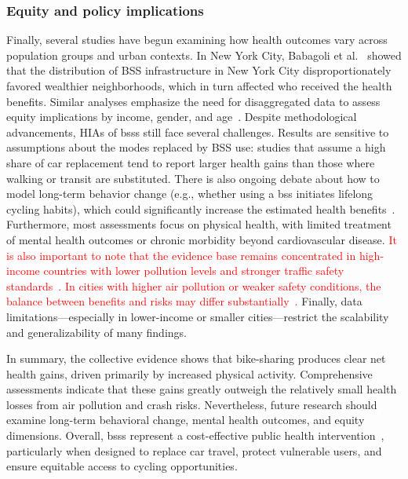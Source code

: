     \subsubsection{Equity and policy implications}

Finally, several studies have begun examining how health outcomes vary across population groups and urban contexts. In New York City, Babagoli et al.~\cite{Babagoli2019} showed that the distribution of BSS infrastructure in New York City disproportionately favored wealthier neighborhoods, which in turn affected who received the health benefits. Similar analyses emphasize the need for disaggregated data to assess equity implications by income, gender, and age~\cite{Clockston2021}. Despite methodological advancements, HIAs of \acp{bss} still face several challenges. Results are sensitive to assumptions about the modes replaced by BSS use: studies that assume a high share of car replacement tend to report larger health gains than those where walking or transit are substituted. There is also ongoing debate about how to model long-term behavior change (e.g., whether using a \ac{bss} initiates lifelong cycling habits), which could significantly increase the estimated health benefits~\cite{Bauman2017}. Furthermore, most assessments focus on physical health, with limited treatment of mental health outcomes or chronic morbidity beyond cardiovascular disease. \textcolor{red}{It is also important to note that the evidence base remains concentrated in high-income countries with lower pollution levels and stronger traffic safety standards~\cite{Teixeira2020, WHO2018}. In cities with higher air pollution or weaker safety conditions, the balance between benefits and risks may differ substantially~\cite{Tainio2016}.} Finally, data limitations—especially in lower-income or smaller cities—restrict the scalability and generalizability of many findings.


In summary, the collective evidence shows that bike-sharing produces clear net health gains, driven primarily by increased physical activity. Comprehensive assessments indicate that these gains greatly outweigh the relatively small health losses from air pollution and crash risks. Nevertheless, future research should examine long-term behavioral change, mental health outcomes, and equity dimensions. Overall, \acp{bss} represent a cost-effective public health intervention~\cite{Yu2018}, particularly when designed to replace car travel, protect vulnerable users, and ensure equitable access to cycling opportunities.





